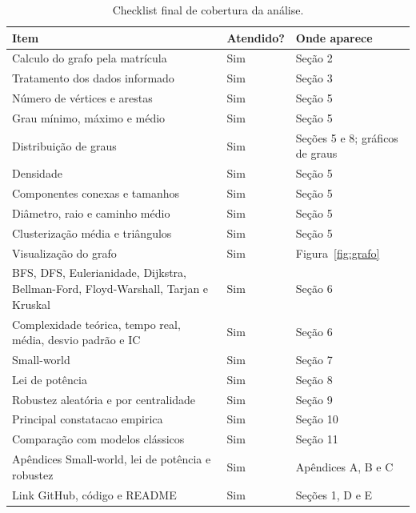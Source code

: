 \documentclass[sigconf]{webmedia}
\begin{document}
\begin{table}
  \caption{Checklist final de cobertura da análise.}
  \label{tab:checklist}
  \begin{tabular}{@{}p{}p{}p{}@{}}
    \toprule
    Item & Atendido? & Onde aparece \\
    \midrule
    Calculo do grafo pela matrícula & Sim & Seção 2 \\
    Tratamento dos dados informado & Sim & Seção 3 \\
    Número de vértices e arestas & Sim & Seção 5 \\
    Grau mínimo, máximo e médio & Sim & Seção 5 \\
    Distribuição de graus & Sim & Seções 5 e 8; gráficos de graus \\
    Densidade & Sim & Seção 5 \\
    Componentes conexas e tamanhos & Sim & Seção 5 \\
    Diâmetro, raio e caminho médio & Sim & Seção 5 \\
    Clusterização média e triângulos & Sim & Seção 5 \\
    Visualização do grafo & Sim & Figura~\ref{fig:grafo} \\
    BFS, DFS, Eulerianidade, Dijkstra, Bellman-Ford, Floyd-Warshall, Tarjan e Kruskal & Sim & Seção 6 \\
    Complexidade teórica, tempo real, média, desvio padrão e IC & Sim & Seção 6 \\
    Small-world & Sim & Seção 7 \\
    Lei de potência & Sim & Seção 8 \\
    Robustez aleatória e por centralidade & Sim & Seção 9 \\
    Principal constatacao empirica & Sim & Seção 10 \\
    Comparação com modelos clássicos & Sim & Seção 11 \\
    Apêndices Small-world, lei de potência e robustez & Sim & Apêndices A, B e C \\
    Link GitHub, código e README & Sim & Seções 1, D e E \\
    \bottomrule
  \end{tabular}
\end{table}
\end{document}
